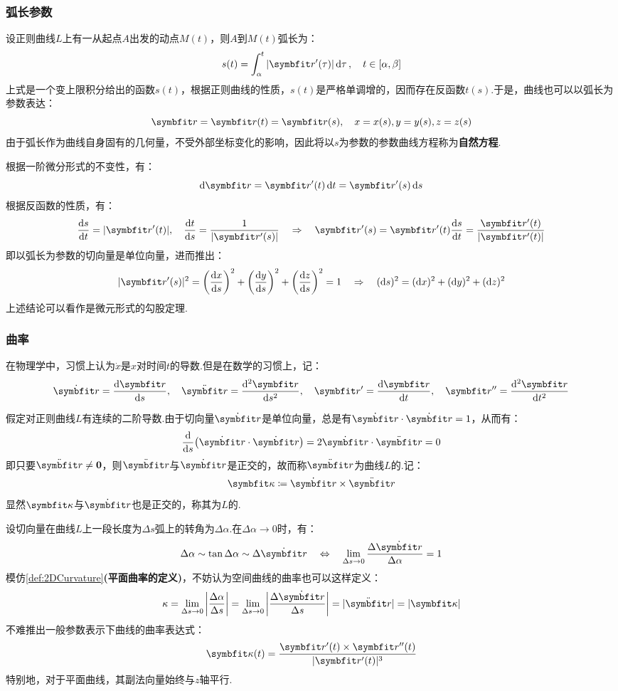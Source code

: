 \subsubsection{弧长参数}
设正则曲线$L$上有一从起点$A$出发的动点$M(t)$，则$A$到$M(t)$弧长为：
\[s(t) = \int_{\alpha}^{t}|\vb{r}'(\tau)|\dd{\tau},\quad t\in[\alpha,\beta]\]
上式是一个变上限积分给出的函数$s(t)$，根据正则曲线的性质，$s(t)$是严格单调增的，因而存在反函数$t(s)$.于是，曲线也可以以弧长为参数表达：
\[\vb{r} = \vb{r}(t) = \vb{r}(s),\quad x=x(s),y=y(s),z=z(s)\]
由于弧长作为曲线自身固有的几何量，不受外部坐标变化的影响，因此将以$s$为参数的参数曲线方程称为\textbf{自然方程}.

根据一阶微分形式的不变性，有：
\[\dd{\vb{r}} = \vb{r}'(t)\dd{t} = \vb{r}'(s)\dd{s}\]
根据反函数的性质，有：
\[\dv{s}{t} = |\vb{r}'(t)|,\quad \dv{t}{s} = \frac{1}{|\vb{r}'(s)|} \quad\Rightarrow\quad \vb{r}'(s) = \vb{r}'(t)\dv{s}{t} = \frac{\vb{r}'(t)}{|\vb{r}'(t)|}\]
即以弧长为参数的切向量是单位向量，进而推出：
\[|\vb{r}'(s)|^2 = \left(\dv{x}{s}\right)^2 + \left(\dv{y}{s}\right)^2 + \left(\dv{z}{s}\right)^2 = 1 \quad\Rightarrow\quad (\dd{s})^2 = (\dd{x})^2 + (\dd{y})^2 + (\dd{z})^2\]
上述结论可以看作是微元形式的勾股定理.


\subsubsection{曲率}
在物理学中，习惯上认为$\dot{x}$是$x$对时间$t$的导数.但是在数学的习惯上，记：
\[\dot{\vb{r}} = \dv{\vb{r}}{s},\quad \ddot{\vb{r}} = \dv[2]{\vb{r}}{s},\quad \vb{r}' = \dv{\vb{r}}{t},\quad \vb{r}'' = \dv[2]{\vb{r}}{t}\]
\begin{definition}
    假定对正则曲线$L$有连续的二阶导数.由于切向量$\dot{\vb{r}}$是单位向量，总是有$\dot{\vb{r}}\cdot\dot{\vb{r}} = 1$，从而有：
    \[\dv{s}(\dot{\vb{r}}\cdot\dot{\vb{r}}) = 2\dot{\vb{r}}\cdot\ddot{\vb{r}} = 0\]
    即只要$\ddot{\vb{r}}\neq\bm{0}$，则$\ddot{\vb{r}}$与$\dot{\vb{r}}$是正交的，故而称$\ddot{\vb{r}}$为曲线$L$的.记：
    \[\vb{\kappa} \coloneq \dot{\vb{r}}\times\ddot{\vb{r}}\]
    显然$\vb{\kappa}$与$\dot{\vb{r}}$也是正交的，称其为$L$的.
\end{definition}
设切向量在曲线$L$上一段长度为$\Delta s$弧上的转角为$\Delta\alpha$.在$\Delta\alpha\to0$时，有：
\[\Delta\alpha \sim \tan\Delta\alpha \sim \Delta\dot{\vb{r}} \quad\Leftrightarrow\quad \lim_{\Delta s \to 0}\frac{\Delta\dot{\vb{r}}}{\Delta\alpha} = 1\]
模仿\cref{def:2DCurvature}\textbf{(平面曲率的定义)}，不妨认为空间曲线的曲率也可以这样定义：
\[\kappa = \lim_{\Delta s \to 0}\left|\frac{\Delta\alpha}{\Delta s}\right| = \lim_{\Delta s \to 0}\left|\frac{\Delta\dot{\vb{r}}}{\Delta s}\right| = |\ddot{\vb{r}}| = |\vb{\kappa}|\]
不难推出一般参数表示下曲线的曲率表达式：
\[\vb{\kappa}(t) = \frac{\vb{r}'(t)\times\vb{r}''(t)}{|\vb{r}'(t)|^3}\]
特别地，对于平面曲线，其副法向量始终与$z$轴平行.



